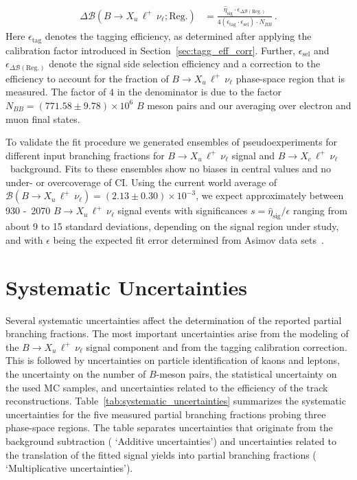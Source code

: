 \documentclass[twocolumn,aps,prd,superscriptaddress,nofootinbib,floatfix,preprintnumbers,a4]{revtex4-1}
\newcommand{\bulnu}{\ensuremath{B \to X_u \, \ell^+\, \nu_{\ell}}\xspace}
\newcommand{\bclnu}{\ensuremath{B \to X_c \, \ell^+\, \nu_{\ell}}\xspace}
\begin{document}
\begin{align} \label{eq:deltaBF}
 \Delta\mathcal{B}(\bulnu; \mathrm{Reg.}) & = \frac{ \widehat  \eta_{\mathrm{sig}}  \cdot  \epsilon_{\Delta \mathcal{B}(\mathrm{Reg.})}  }{4 \left( \epsilon_{\mathrm{tag}} \cdot \epsilon_{\mathrm{sel}} \right) \cdot N_{BB}} \, .
\end{align} 
Here $\epsilon_{\mathrm{tag}}$ denotes the tagging efficiency, as determined after applying the calibration factor introduced in Section~\ref{sec:tagg_eff_corr}. Further, $\epsilon_{\mathrm{sel}}$ and $\epsilon_{\Delta \mathcal{B}(\text{Reg.})}$ denote the signal side selection efficiency and a correction to the efficiency to account for the fraction of \bulnu phase-space region that is measured. The factor of $4$ in the denominator is due to the factor $N_{BB} = \left(771.58 \pm 9.78 \right) \times 10^{6}$ $B$ meson pairs and our averaging over electron and muon final states. 

To validate the fit procedure we generated ensembles of pseudoexperiments for different input branching fractions for \bulnu signal and \bclnu\ background. Fits to these ensembles show no biases in central values and no under- or overcoverage of CI. Using the current world average of $\mathcal{B}(\bulnu) = \left( 2.13 \pm 0.30 \right) \times 10^{-3}$, we expect approximately between  930 \--\ 2070 \bulnu signal events with significances $s = \widehat  \eta_{\mathrm{sig}} / \epsilon$ ranging from about 9 to 15 standard deviations, depending on the signal region under study, and with $\epsilon$ being the expected fit error determined from Asimov data sets~\cite{Cowan:2010js}. 

\section{Systematic Uncertainties}\label{sec:syst}

Several systematic uncertainties affect the determination of the reported partial branching fractions.  The most important uncertainties arise from the modeling of the \bulnu signal component and from the tagging calibration correction. This is followed by uncertainties on particle identification of kaons and leptons, the uncertainty on the number of $B$-meson pairs, the statistical uncertainty on the used MC samples, and uncertainties related to the efficiency of the track reconstructions. Table~\ref{tab:systematic_uncertainties} summarizes the systematic uncertainties for the five measured partial branching fractions probing three phase-space regions. The table separates uncertainties that originate from the background subtraction ( `Additive uncertainties') and uncertainties related to the translation of the fitted signal yields into partial branching fractions ( `Multiplicative uncertainties'). 
\end{document}
